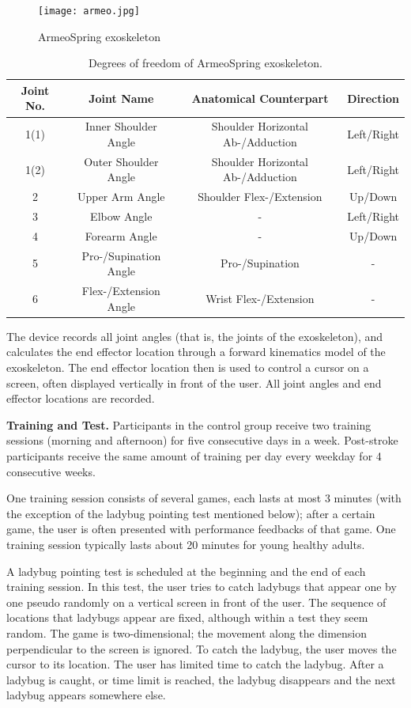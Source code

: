 \begin{figure}
	\texttt{[image: armeo.jpg]}
	\centering
	\caption{ArmeoSpring exoskeleton}
	\label{fig:armeo}
\end{figure}

\begin{table}
	\begin{tabular}{c c c c}
		\hline
		Joint No. & Joint Name & Anatomical Counterpart & Direction \\
		\hline
		1(1) & Inner Shoulder Angle & Shoulder Horizontal Ab-/Adduction & Left/Right \\
		1(2) & Outer Shoulder Angle & Shoulder Horizontal Ab-/Adduction & Left/Right \\
		2 & Upper Arm Angle & Shoulder Flex-/Extension & Up/Down \\
		3 & Elbow Angle & - & Left/Right \\
		4 & Forearm Angle & - & Up/Down \\
		5 & Pro-/Supination Angle & Pro-/Supination & - \\ 
		6 & Flex-/Extension Angle & Wrist Flex-/Extension & - \\
		\hline
	\end{tabular}
	\caption{Degrees of freedom of ArmeoSpring exoskeleton.}
	\label{tab:devicedof}
\end{table}

The device records all joint angles (that is, the joints of the exoskeleton), and calculates the end effector location through a forward kinematics model of the exoskeleton. 
The end effector location then is used to control a cursor on a screen, often displayed vertically in front of the user. 
All joint angles and end effector locations are recorded.

\textbf{Training and Test.}
Participants in the control group receive two training sessions (morning and afternoon) for five consecutive days in a week.
Post-stroke participants receive the same amount of training per day every weekday for 4 consecutive weeks.

One training session consists of several games, each lasts at most 3 minutes (with the exception of the ladybug pointing test mentioned below); after a certain game, the user is often presented with performance feedbacks of that game. 
One training session typically lasts about 20 minutes for young healthy adults.

A ladybug pointing test is scheduled at the beginning and the end of each training session. 
In this test, the user tries to catch ladybugs that appear one by one pseudo randomly on a vertical screen in front of the user. 
The sequence of locations that ladybugs appear are fixed, although within a test they seem random.
The game is two-dimensional; the movement along the dimension perpendicular to the screen is ignored. 
To catch the ladybug, the user moves the cursor to its location. 
The user has limited time to catch the ladybug.
After a ladybug is caught, or time limit is reached, the ladybug disappears and the next ladybug appears somewhere else. 

